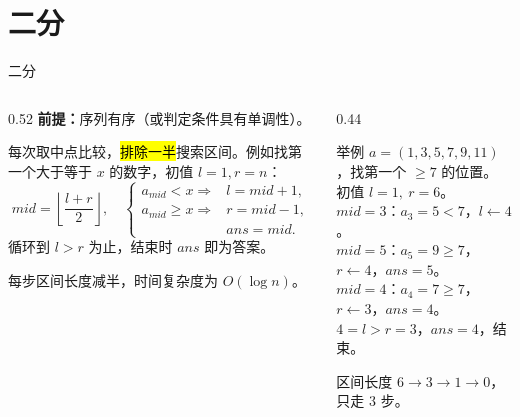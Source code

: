 \documentclass[aspectratio=169]{beamer}
\begin{document}
\section{二分}

\begin{frame}{二分}
    \begin{columns}[T]
        \begin{column}{0.52\textwidth}
            \small
            \textbf{前提：}序列有序（或判定条件具有单调性）。

            \vspace{0.3em}
            每次取中点比较，\hl{排除一半}搜索区间。例如找第一个大于等于 $x$ 的数字，初值 $l=1,r=n$：
            \[
                \textit{mid}=\left\lfloor\frac{l+r}{2}\right\rfloor,
                \quad
                \begin{cases}
                    a_{\textit{mid}}<x \Rightarrow &l=\textit{mid}+1,\\[3pt]
                    a_{\textit{mid}}\ge x \Rightarrow &r=\textit{mid}-1,\\
                    &ans=\textit{mid}.
                \end{cases}
            \]
            循环到 $l>r$ 为止，结束时 $ans$ 即为答案。

            \vspace{0.4em}
            每步区间长度减半，时间复杂度为 $O(\log n)$。
        \end{column}
        \begin{column}{0.44\textwidth}
            \begin{exampleblock}{举例}
                \footnotesize
                $a=(1,3,5,7,9,11)$，找第一个 $\ge 7$ 的位置。\\
                \vspace{0.3em}
                初值 $l=1,\ r=6$。\\
                \vspace{0.3em}
                $\textit{mid}=3$：$a_3=5<7$，$l\leftarrow 4$。\\[2pt]
                $\textit{mid}=5$：$a_5=9\ge7$，$r\leftarrow 4$，$ans=5$。\\[2pt]
                $\textit{mid}=4$：$a_4=7\ge7$，$r\leftarrow 3$，$ans=4$。\\[2pt]
                $4=l>r=3$，$ans=4$，结束。
            \end{exampleblock}
            \vspace{0.8em}
            \footnotesize
            区间长度 $6\to 3\to 1\to 0$，
            只走 $3$ 步。
        \end{column}
    \end{columns}
\end{frame}
\end{document}
